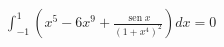 \item $\displaystyle \int_{-1}^1 \left( x^5 - 6x^9 + \frac{\operatorname{sen} x}{(1 + x^4)^2} \right) dx = 0$
